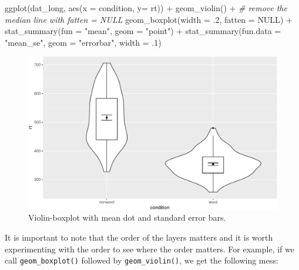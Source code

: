 \documentclass[
  english,
  doc,floatsintext]{apa6}
\newenvironment{Shaded}{\begin{snugshade}}{\end{snugshade}}
\newcommand{\AttributeTok}[1]{\textcolor[rgb]{0.77,0.63,0.00}{#1}}
\newcommand{\CommentTok}[1]{\textcolor[rgb]{0.56,0.35,0.01}{\textit{#1}}}
\newcommand{\ConstantTok}[1]{\textcolor[rgb]{0.00,0.00,0.00}{#1}}
\newcommand{\DecValTok}[1]{\textcolor[rgb]{0.00,0.00,0.81}{#1}}
\newcommand{\FunctionTok}[1]{\textcolor[rgb]{0.00,0.00,0.00}{#1}}
\newcommand{\NormalTok}[1]{#1}
\newcommand{\SpecialCharTok}[1]{\textcolor[rgb]{0.00,0.00,0.00}{#1}}
\newcommand{\StringTok}[1]{\textcolor[rgb]{0.31,0.60,0.02}{#1}}
\begin{document}
\begin{Shaded}
\begin{Highlighting}[]
\FunctionTok{ggplot}\NormalTok{(dat\_long, }\FunctionTok{aes}\NormalTok{(}\AttributeTok{x =}\NormalTok{ condition, }\AttributeTok{y=}\NormalTok{ rt)) }\SpecialCharTok{+}
  \FunctionTok{geom\_violin}\NormalTok{() }\SpecialCharTok{+}
  \CommentTok{\# remove the median line with fatten = NULL}
  \FunctionTok{geom\_boxplot}\NormalTok{(}\AttributeTok{width =}\NormalTok{ .}\DecValTok{2}\NormalTok{, }
               \AttributeTok{fatten =} \ConstantTok{NULL}\NormalTok{) }\SpecialCharTok{+}
  \FunctionTok{stat\_summary}\NormalTok{(}\AttributeTok{fun =} \StringTok{"mean"}\NormalTok{, }\AttributeTok{geom =} \StringTok{"point"}\NormalTok{) }\SpecialCharTok{+}
  \FunctionTok{stat\_summary}\NormalTok{(}\AttributeTok{fun.data =} \StringTok{"mean\_se"}\NormalTok{, }
               \AttributeTok{geom =} \StringTok{"errorbar"}\NormalTok{, }
               \AttributeTok{width =}\NormalTok{ .}\DecValTok{1}\NormalTok{)}
\end{Highlighting}
\end{Shaded}

\begin{figure}

{\centering \includegraphics[width=1\linewidth]{images/viobox1-1} 

}

\caption{Violin-boxplot with mean dot and standard error bars.}\label{fig:viobox1}
\end{figure}

It is important to note that the order of the layers matters and it is worth experimenting with the order to see where the order matters. For example, if we call \texttt{geom\_boxplot()} followed by \texttt{geom\_violin()}, we get the following mess:
\end{document}
